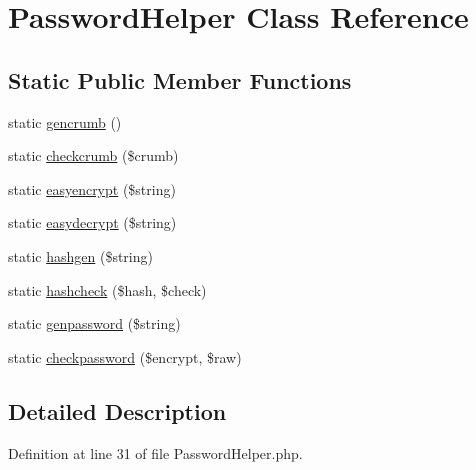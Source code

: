 \hypertarget{class_utopia_1_1_components_1_1_helper_1_1_password_helper}{
\section{PasswordHelper Class Reference}
\label{class_utopia_1_1_components_1_1_helper_1_1_password_helper}
}
\subsection*{Static Public Member Functions}
\begin{DoxyCompactItemize}
\item 
static \hyperlink{class_utopia_1_1_components_1_1_helper_1_1_password_helper_a5122a00aa22b71467d37b7dbb7b482d2}{gencrumb} ()
\item 
static \hyperlink{class_utopia_1_1_components_1_1_helper_1_1_password_helper_ab959cdecde78aea575ab08640440e4b0}{checkcrumb} (\$crumb)
\item 
static \hyperlink{class_utopia_1_1_components_1_1_helper_1_1_password_helper_a9b4be38dfba681937650eb6e34a255b8}{easyencrypt} (\$string)
\item 
static \hyperlink{class_utopia_1_1_components_1_1_helper_1_1_password_helper_a850529648fcb463c9d5668ba231cc97e}{easydecrypt} (\$string)
\item 
static \hyperlink{class_utopia_1_1_components_1_1_helper_1_1_password_helper_a4503f9a7815466d08c0cdb6dcd4bfdf4}{hashgen} (\$string)
\item 
static \hyperlink{class_utopia_1_1_components_1_1_helper_1_1_password_helper_a4ccb5bad00e4dc5bc189664775674e70}{hashcheck} (\$hash, \$check)
\item 
static \hyperlink{class_utopia_1_1_components_1_1_helper_1_1_password_helper_a0aa2962f379e68b5327168cfcdd2c729}{genpassword} (\$string)
\item 
static \hyperlink{class_utopia_1_1_components_1_1_helper_1_1_password_helper_a17991481f0faec75004d2bca6b6b35df}{checkpassword} (\$encrypt, \$raw)
\end{DoxyCompactItemize}


\subsection{Detailed Description}


Definition at line 31 of file PasswordHelper.php.



